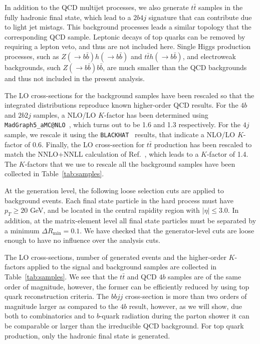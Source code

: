 In addition to the QCD multijet processes,
we also generate $t\bar{t}$ samples
in the fully hadronic final state, which lead to a
$2b4j$ signature that can
contribute due to light jet mistags.
%
This background processes leads a similar topology that
the corresponding QCD sample.
%
Leptonic decays of top quarks can be removed by requiring
a lepton veto, and thus are not included here.
%
Single Higgs production processes, such as $Z(\to b\bar{b})h(\to b\bar{b})$
and $t\bar{t}h(\to b\bar{b})$, and electroweak backgrounds, such $Z(\to b\bar{b})b\bar{b}$,
are much smaller than the QCD backgrounds~\cite{Wardrope:2014kya,deLima:2014dta}
and thus not included in the present analysis.
%



The LO cross-sections for
the background samples have been rescaled so that the integrated
distributions reproduce known higher-order QCD results.
%
For the $4b$ and $2b2j$ samples, a NLO/LO $K$-factor has been determined
using {\tt MadGraph5\_aMC@NLO}~\cite{Alwall:2014hca}, which turns out to be 1.6 and 1.3
respectively.
%
For the $4j$ sample, we rescale it using the {\tt BLACKHAT}~\cite{Bern:2011ep}
results, that indicate
a NLO/LO $K$-factor of 0.6.
%
Finally, the LO cross-section for $t\bar{t}$ production has been rescaled
to match the NNLO+NNLL calculation of Ref.~\cite{Czakon:2013goa}, which leads
to a $K$-factor of 1.4.
%
The $K$-factors that we use to rescale all the background samples have been collected in
Table~\ref{tab:samples}.


At the generation level, the following loose selection 
cuts are applied to
background events.
%
Each final state particle in the hard process must have $p_T \ge 20$ GeV, and be located
in the central  rapidity
region with
$| \eta | \le 3.0$.
%
In addition, at the matrix-element level
all final state particles must be separated by a minimum $\Delta R_{\mathrm{min}} =0.1$.
%
We have checked that the generator-level cuts are loose enough to have
no influence over the analysis cuts.
%


The LO cross-sections,
number of generated events and the higher-order $K$-factors
applied to the signal and background
samples are collected in Table~\ref{tab:samples}.
%
We see that the $t\bar{t}$ and QCD $4b$ samples are of
the same order of magnitude, however, the former can be efficiently
reduced by using top quark reconstruction criteria.
%
The $bbjj$ cross-section is more than two orders
of magnitude larger as compared to the
$4b$ result, however, as we will show,
due both to combinatorics and to $b$-quark radiation
during the parton shower it can be comparable or larger
than the irreducible QCD background.
%
 For top quark production, only the hadronic final state is generated.
 
